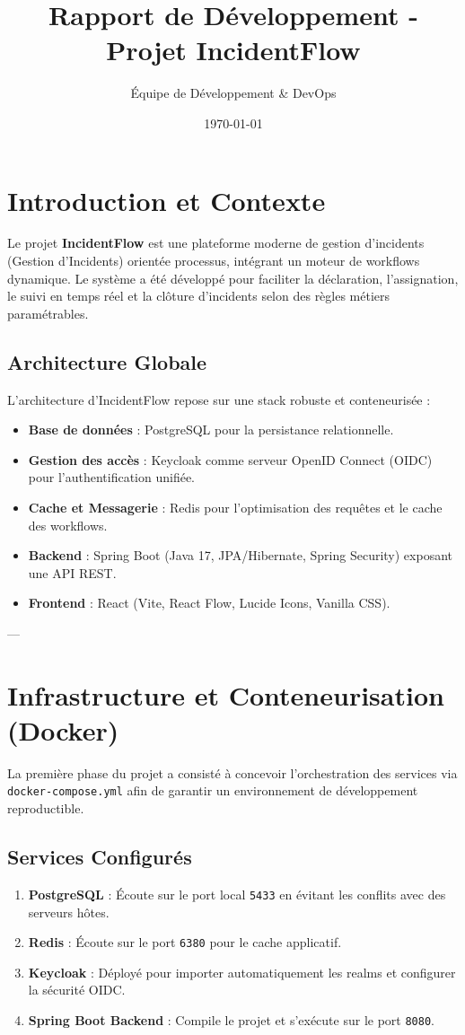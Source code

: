 \documentclass[12pt]{article}
\title{Rapport de Développement - Projet IncidentFlow}
\author{Équipe de Développement \& DevOps}
\date{\today}
\begin{document}
\maketitle
\tableofcontents
\newpage

\section{Introduction et Contexte}
Le projet \textbf{IncidentFlow} est une plateforme moderne de gestion d'incidents (Gestion d'Incidents) orientée processus, intégrant un moteur de workflows dynamique. Le système a été développé pour faciliter la déclaration, l'assignation, le suivi en temps réel et la clôture d'incidents selon des règles métiers paramétrables. 

\subsection{Architecture Globale}
L'architecture d'IncidentFlow repose sur une stack robuste et conteneurisée :
\begin{itemize}
    \item \textbf{Base de données} : PostgreSQL pour la persistance relationnelle.
    \item \textbf{Gestion des accès} : Keycloak comme serveur OpenID Connect (OIDC) pour l'authentification unifiée.
    \item \textbf{Cache et Messagerie} : Redis pour l'optimisation des requêtes et le cache des workflows.
    \item \textbf{Backend} : Spring Boot (Java 17, JPA/Hibernate, Spring Security) exposant une API REST.
    \item \textbf{Frontend} : React (Vite, React Flow, Lucide Icons, Vanilla CSS).
\end{itemize}

---

\section{Infrastructure et Conteneurisation (Docker)}
La première phase du projet a consisté à concevoir l'orchestration des services via \texttt{docker-compose.yml} afin de garantir un environnement de développement reproductible.

\subsection{Services Configurés}
\begin{enumerate}
    \item \textbf{PostgreSQL} : Écoute sur le port local \texttt{5433} en évitant les conflits avec des serveurs hôtes.
    \item \textbf{Redis} : Écoute sur le port \texttt{6380} pour le cache applicatif.
    \item \textbf{Keycloak} : Déployé pour importer automatiquement les realms et configurer la sécurité OIDC.
    \item \textbf{Spring Boot Backend} : Compile le projet et s'exécute sur le port \texttt{8080}.
\end{enumerate}
\end{document}
